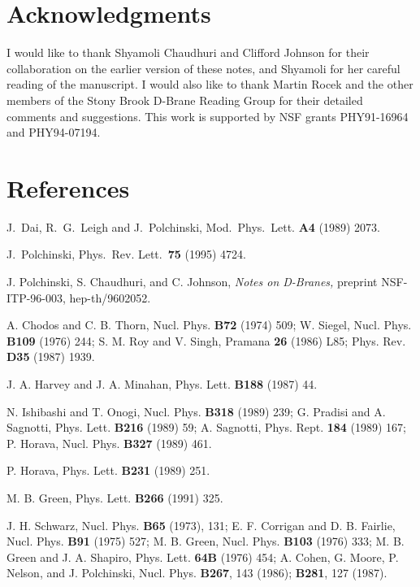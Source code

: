 \documentclass[12pt]{article}
\begin{document}
\section*{Acknowledgments}
I would like to thank Shyamoli Chaudhuri and Clifford Johnson for their
collaboration on the earlier version of these notes, and Shyamoli for her
careful reading of the manuscript.  I would also like to thank Martin
Rocek and the other members of the Stony Brook D-Brane Reading Group for
their detailed comments and suggestions.  This work is supported by NSF grants
PHY91-16964 and PHY94-07194.


\section*{References}
\begin{thebibliography}{99}

J.~Dai, R.~G.~Leigh and J.~Polchinski, Mod.~Phys.~Lett.
{\bf A4} (1989) 2073.

J.~Polchinski, Phys.~Rev. Lett.~{\bf 75} (1995) 4724.

J. Polchinski, S. Chaudhuri, and C. Johnson, {\it Notes on
D-Branes,} preprint NSF-ITP-96-003, hep-th/9602052.

A. Chodos and C. B. Thorn, Nucl. Phys. {\bf B72} (1974) 509;\hfil\break
W. Siegel, Nucl. Phys. {\bf B109} (1976) 244;\hfil\break
S. M. Roy and V. Singh, Pramana {\bf 26} (1986) L85; Phys. Rev. {\bf D35}
(1987) 1939.

J. A. Harvey and J. A. Minahan, Phys. Lett. {\bf B188} (1987) 44.

N. Ishibashi and T. Onogi, Nucl. Phys. {\bf B318} (1989) 239;\hfil\break
G. Pradisi and A. Sagnotti, Phys. Lett. {\bf B216} (1989) 59;\hfil\break
A. Sagnotti, Phys. Rept. {\bf 184} (1989) 167;\hfil\break 
P. Horava, Nucl. Phys. {\bf B327} (1989) 461.

P. Horava, Phys. Lett. {\bf B231} (1989) 251.

M. B. Green, Phys. Lett. {\bf B266} (1991) 325. 

J. H. Schwarz, Nucl. Phys. {\bf B65} (1973), 131;\hfil\break  
E. F. Corrigan and D. B. Fairlie, Nucl. Phys. {\bf B91} (1975)
527;\hfil\break 
M. B. Green, Nucl. Phys. {\bf B103} (1976) 333;\hfil\break 
M. B. Green and J. A. Shapiro, Phys. Lett. {\bf 64B} (1976) 454;\hfil\break 
A. Cohen, G. Moore, P. Nelson, and J. Polchinski, Nucl. Phys. {\bf B267}, 143
(1986); {\bf B281}, 127 (1987).


\end{thebibliography}
\end{document}
